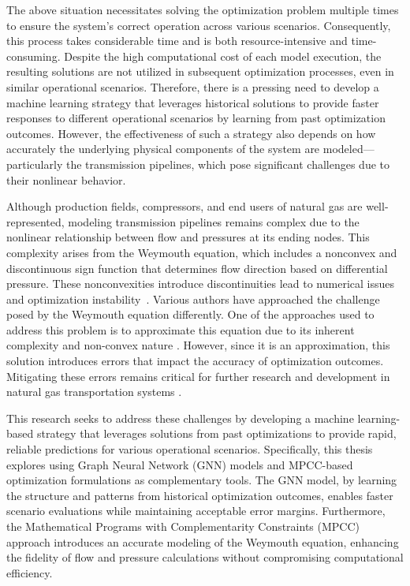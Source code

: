 The above situation necessitates solving the optimization problem multiple times to ensure the system's correct operation across various scenarios. Consequently, this process takes considerable time and is both resource-intensive and time-consuming. Despite the high computational cost of each model execution, the resulting solutions are not utilized in subsequent optimization processes, even in similar operational scenarios. Therefore, there is a pressing need to develop a machine learning strategy that leverages historical solutions to provide faster responses to different operational scenarios by learning from past optimization outcomes. However, the effectiveness of such a strategy also depends on how accurately the underlying physical components of the system are modeled—particularly the transmission pipelines, which pose significant challenges due to their nonlinear behavior.

Although production fields, compressors, and end users of natural gas are well-represented, modeling transmission pipelines remains complex due to the nonlinear relationship between flow and pressures at its ending nodes. This complexity arises from the Weymouth equation, which includes a nonconvex and discontinuous sign function that determines flow direction based on differential pressure. These nonconvexities introduce discontinuities lead to numerical issues and optimization instability~\cite{YANG2020106023, JIANG2021106460}. Various authors have approached the challenge posed by the Weymouth equation differently. One of the approaches used to address this problem is to approximate this equation due to its inherent complexity and non-convex nature \cite{9031712}. However, since it is an approximation, this solution introduces errors that impact the accuracy of optimization outcomes. Mitigating these errors remains critical for further research and development in natural gas transportation systems \cite{review}.


This research seeks to address these challenges by developing a machine learning-based strategy that leverages solutions from past optimizations to provide rapid, reliable predictions for various operational scenarios. Specifically, this thesis explores using Graph Neural Network (GNN) models and MPCC-based optimization formulations as complementary tools. The GNN model, by learning the structure and patterns from historical optimization outcomes, enables faster scenario evaluations while maintaining acceptable error margins. Furthermore, the Mathematical Programs with Complementarity Constraints (MPCC) approach introduces an accurate modeling of the Weymouth equation, enhancing the fidelity of flow and pressure calculations without compromising computational efficiency.





